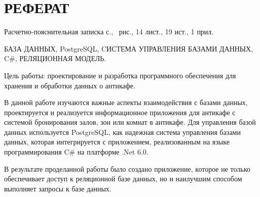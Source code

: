 \chapter*{РЕФЕРАТ}

Расчетно-пояснительная записка \pageref{LastPage} с., \totalfigures\ рис., 14 лист., 19 ист., 1 прил.

БАЗА ДАННЫХ, PostgreSQL, CИСТЕМА УПРАВЛЕНИЯ БАЗАМИ ДАННЫХ, C\#, РЕЛЯЦИОННАЯ МОДЕЛЬ.

Цель работы: проектирование и разработка программного обеспечения для хранения и обработки данных о антикафе.

В данной работе изучаются важные аспекты взаимодействия с базами данных, проектируется и реализуется информационное приложения для антикафе с системой бронирования залов, зон или комнат в антикафе.
Для управления базой данных используется PostgreSQL, как надежная система управления базами данных, которая интегрируется с приложением, реализованным на языке программирования C\# на платформе .Net 6.0.

В результате проделанной работы было создано приложение, которое не только обеспечивает доступ к реляционной базе данных, но и наилучшим способом выполняет запросы к базе данных. 